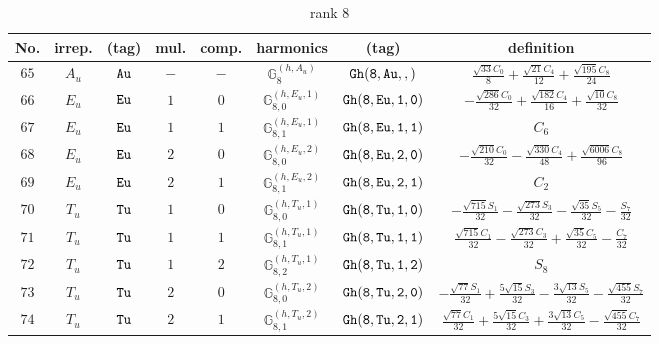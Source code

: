 \documentclass[fleqn,8pt]{jsarticle}
\begin{document}
\begin{table}[ht!]
\begin{center}
\caption{rank 8}
\renewcommand{\arraystretch}{1.3}
\begin{tabular}{cccccccc} \hline \hline
No. & irrep. & (tag) & mul. & comp. & harmonics & (tag) & definition \\ \hline
$ 65 $ & $ A_{u} $ & $ {\tt Au} $ & $ - $ & $ - $ & $ \mathbb{G}_{8}^{(h,A_{u})} $ & $ {\tt Gh(8,Au,,)} $ & $ \frac{\sqrt{33} C_{0}}{8} + \frac{\sqrt{21} C_{4}}{12} + \frac{\sqrt{195} C_{8}}{24} $ \\
$ 66 $ & $ E_{u} $ & $ {\tt Eu} $ & $ 1 $ & $ 0 $ & $ \mathbb{G}_{8,0}^{(h,E_{u},1)} $ & $ {\tt Gh(8,Eu,1,0)} $ & $ - \frac{\sqrt{286} C_{0}}{32} + \frac{\sqrt{182} C_{4}}{16} + \frac{\sqrt{10} C_{8}}{32} $ \\
$ 67 $ & $ E_{u} $ & $ {\tt Eu} $ & $ 1 $ & $ 1 $ & $ \mathbb{G}_{8,1}^{(h,E_{u},1)} $ & $ {\tt Gh(8,Eu,1,1)} $ & $ C_{6} $ \\
$ 68 $ & $ E_{u} $ & $ {\tt Eu} $ & $ 2 $ & $ 0 $ & $ \mathbb{G}_{8,0}^{(h,E_{u},2)} $ & $ {\tt Gh(8,Eu,2,0)} $ & $ - \frac{\sqrt{210} C_{0}}{32} - \frac{\sqrt{330} C_{4}}{48} + \frac{\sqrt{6006} C_{8}}{96} $ \\
$ 69 $ & $ E_{u} $ & $ {\tt Eu} $ & $ 2 $ & $ 1 $ & $ \mathbb{G}_{8,1}^{(h,E_{u},2)} $ & $ {\tt Gh(8,Eu,2,1)} $ & $ C_{2} $ \\
$ 70 $ & $ T_{u} $ & $ {\tt Tu} $ & $ 1 $ & $ 0 $ & $ \mathbb{G}_{8,0}^{(h,T_{u},1)} $ & $ {\tt Gh(8,Tu,1,0)} $ & $ - \frac{\sqrt{715} S_{1}}{32} - \frac{\sqrt{273} S_{3}}{32} - \frac{\sqrt{35} S_{5}}{32} - \frac{S_{7}}{32} $ \\
$ 71 $ & $ T_{u} $ & $ {\tt Tu} $ & $ 1 $ & $ 1 $ & $ \mathbb{G}_{8,1}^{(h,T_{u},1)} $ & $ {\tt Gh(8,Tu,1,1)} $ & $ \frac{\sqrt{715} C_{1}}{32} - \frac{\sqrt{273} C_{3}}{32} + \frac{\sqrt{35} C_{5}}{32} - \frac{C_{7}}{32} $ \\
$ 72 $ & $ T_{u} $ & $ {\tt Tu} $ & $ 1 $ & $ 2 $ & $ \mathbb{G}_{8,2}^{(h,T_{u},1)} $ & $ {\tt Gh(8,Tu,1,2)} $ & $ S_{8} $ \\
$ 73 $ & $ T_{u} $ & $ {\tt Tu} $ & $ 2 $ & $ 0 $ & $ \mathbb{G}_{8,0}^{(h,T_{u},2)} $ & $ {\tt Gh(8,Tu,2,0)} $ & $ - \frac{\sqrt{77} S_{1}}{32} + \frac{5 \sqrt{15} S_{3}}{32} - \frac{3 \sqrt{13} S_{5}}{32} - \frac{\sqrt{455} S_{7}}{32} $ \\
$ 74 $ & $ T_{u} $ & $ {\tt Tu} $ & $ 2 $ & $ 1 $ & $ \mathbb{G}_{8,1}^{(h,T_{u},2)} $ & $ {\tt Gh(8,Tu,2,1)} $ & $ \frac{\sqrt{77} C_{1}}{32} + \frac{5 \sqrt{15} C_{3}}{32} + \frac{3 \sqrt{13} C_{5}}{32} - \frac{\sqrt{455} C_{7}}{32} $ \\

\end{tabular}
\end{center}
\end{table}
\end{document}
